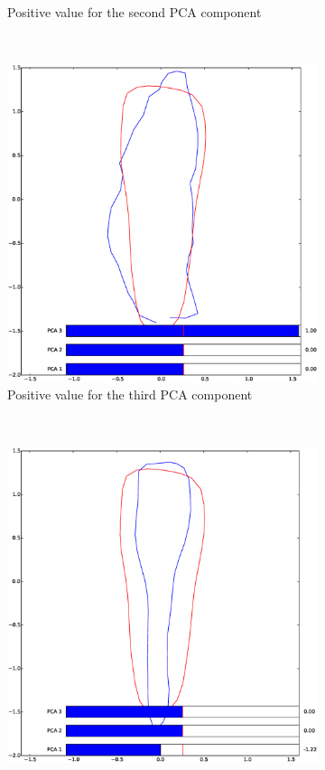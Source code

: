\documentclass[a4paper,10pt]{article}
\begin{document}
\begin{figure}[htbp]
\begin{subfigure}{0.30\textwidth}
		\caption{Positive value for the second PCA component}
	\end{subfigure}
	~
	\begin{subfigure}{0.30\textwidth}
		\centering
		\includegraphics[width=\textwidth, trim=0cm 2.5cm 0cm 3cm, clip]{pca3_pos}
		\caption{Positive value for the third PCA component}
	\end{subfigure}
	\\
	\begin{subfigure}{0.30\textwidth}
		\centering
		\includegraphics[width=\textwidth, trim=0cm 2.5cm 0cm 3cm, clip]{pca1_neg}

\end{subfigure}
\end{figure}
\end{document}
